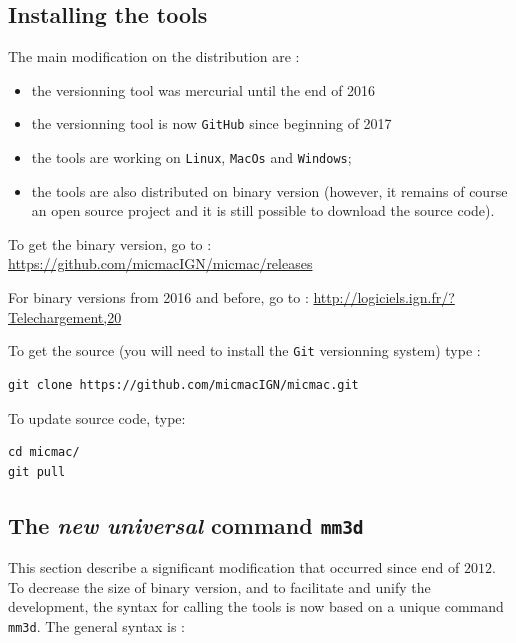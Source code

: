 \subsection{Installing the tools}
\label{Install}

The main modification on the distribution are :

\begin{itemize}
   \item the  versionning tool was mercurial until the end of 2016
   \item  the versionning tool is now {\tt GitHub} since beginning of 2017
   \item  the tools are working on {\tt Linux}, {\tt MacOs} and  {\tt Windows};
   \item  the tools are also distributed on binary version (however, it remains of course an open source project and it is still possible to download the source code).
\end{itemize}

\vspace{0.5cm}
To get the binary version, go to : \url{https://github.com/micmacIGN/micmac/releases}

\vspace{0.5cm}
For binary versions from 2016 and before, go to : \url{http://logiciels.ign.fr/?Telechargement,20}

\vspace{0.5cm}
To get the source (you will need to install the {\tt Git} versionning system) type :

\begin{verbatim}
git clone https://github.com/micmacIGN/micmac.git
\end{verbatim}

To update source code, type:

\begin{verbatim}
cd micmac/ 
git pull
\end{verbatim}

\subsection{The \emph{new universal} command {\tt mm3d}}

This section describe a significant modification that occurred since end of $2012$. To decrease the
size of binary version, and to facilitate and unify the development, the syntax for calling the tools is now
based on a unique command {\tt mm3d}. The general syntax is :

